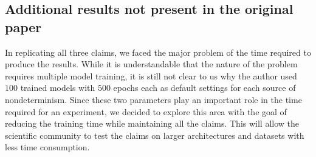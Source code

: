 \begin{table}[!htb]
\centering
{}
	\caption{Reproducibility study for variability reduction. Prominent differences accounted for morethan $10\%$ are shown in red.}
	\label{table:table7}
\end{table}

\subsection{Additional results not present in the original paper}
\label{sec:AdditionalResults}
In replicating all three claims, we faced the major problem of the time required to produce the results. While it is understandable that the nature of the problem requires multiple model training, it is still not clear to us why the author used $100$ trained models with $500$ epochs each as default settings for each source of nondeterminism. Since these two parameters play an important role in the time required for an experiment, we decided to explore this area with the goal of reducing the training time while maintaining all the claims. This will allow the scientific community to test the claims on larger architectures and datasets with less time consumption.

